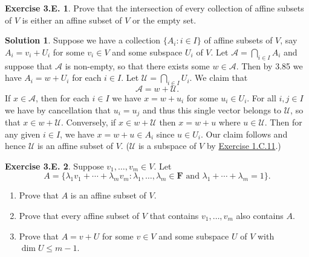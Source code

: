 \documentclass[12pt]{article}
\theoremstyle{definition}
\theoremstyle{exercise}
\newtheorem{exercise}{Exercise 3.E.}
\theoremstyle{solution}
\newtheorem*{solution}{Solution}
\newcommand{\F}{\mathbf{F}}
\begin{document}
\begin{exercise}
\label{ex:10}
    Prove that the intersection of every collection of affine subsets of \( V \) is either an affine subset of \( V \) or the empty set.
\end{exercise}

\begin{solution}
    Suppose we have a collection \( \{ A_i : i \in I \} \) of affine subsets of \( V \), say \( A_i = v_i + U_i \) for some \( v_i \in V \) and some subspace \( U_i \) of \( V \). Let \( \mathscr{A} = \bigcap_{i \in I} A_i \) and suppose that \( \mathscr{A} \) is non-empty, so that there exists some \( w \in \mathscr{A} \). Then by 3.85 we have \( A_i = w + U_i \) for each \( i \in I \). Let \( \mathscr{U} = \bigcap_{i \in I} U_i \). We claim that
    \[
        \mathscr{A} = w + \mathscr{U}.
    \]
    If \( x \in \mathscr{A} \), then for each \( i \in I \) we have \( x = w + u_i \) for some \( u_i \in U_i \). For all \( i, j \in I \) we have by cancellation that \( u_i = u_j \) and thus this single vector belongs to \( \mathscr{U} \), so that \( x \in w + \mathscr{U} \). Conversely, if \( x \in w + \mathscr{U} \) then \( x = w + u \) where \( u \in \mathscr{U} \). Then for any given \( i \in I \), we have \( x = w + u \in A_i \) since \( u \in U_i \). Our claim follows and hence \( \mathscr{U} \) is an affine subset of \( V \). (\(\mathscr{U}\) is a subspace of \( V \) by \href{https://lew98.github.io/Mathematics/LADR_Section_1_C_Exercises.pdf}{Exercise 1.C.11}.)
\end{solution}

\begin{exercise}
\label{ex:11}
    Suppose \( v_1, \ldots, v_m \in V \). Let
    \[
        A = \{ \lambda_1 v_1 + \cdots + \lambda_m v_m : \lambda_1, \ldots, \lambda_m \in \F \text{ and } \lambda_1 + \cdots + \lambda_m = 1\}.
    \]
    \begin{enumerate}
        \item Prove that \( A \) is an affine subset of \( V \).

        \item Prove that every affine subset of \( V \) that contains \( v_1, \ldots, v_m \) also contains \( A \).

        \item Prove that \( A = v + U \) for some \( v \in V \) and some subspace \( U \) of \( V \) with \( \dim U \leq m - 1 \).
    \end{enumerate}
\end{exercise}
\end{document}
